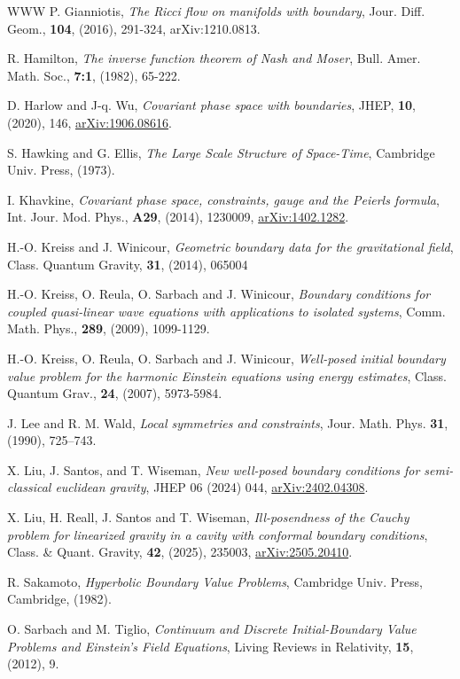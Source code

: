 \documentclass[10pt]{amsart}
\newcommand{\<}{\langle}
\renewcommand{\>}{\rangle}
\theoremstyle{plain}
\theoremstyle{remark}
\theoremstyle{definition}
\numberwithin{equation}{section}
\begin{document}
\begin{thebibliography}{WWW}
 P. Gianniotis, {\it The Ricci flow on manifolds with boundary}, Jour. Diff. Geom., {\bf 104}, (2016), 291-324, 
arXiv:1210.0813. 
 
  R. Hamilton, {\it The inverse function theorem of Nash and Moser}, Bull. Amer. Math. Soc., {\bf 7:1}, (1982), 65-222. 
 
 D. Harlow and J-q. Wu, {\it Covariant phase space with boundaries}, JHEP, {\bf 10}, (2020), 146, 
\href{https://arXiv.org/abs/1906.08616}{arXiv:1906.08616}. 

 S. Hawking and G. Ellis, {\it The Large Scale Structure of Space-Time}, Cambridge Univ. Press, (1973). 

 I. Khavkine, {\it Covariant phase space, constraints, gauge and the Peierls formula}, 
Int. Jour. Mod. Phys., {\bf A29}, (2014), 1230009, \href{https://arXiv.org/abs/1402.1282}{arXiv:1402.1282}. 

 H.-O. Kreiss and J. Winicour, {\it Geometric boundary data for the gravitational field}, Class. Quantum Gravity, 
{\bf 31}, (2014), 065004

 H.-O. Kreiss, O. Reula, O. Sarbach and J. Winicour, {\it Boundary conditions for coupled quasi-linear wave 
equations with applications to isolated systems}, Comm. Math. Phys., {\bf 289}, (2009), 1099-1129.  

 H.-O. Kreiss, O. Reula, O. Sarbach and J. Winicour, {\it Well-posed initial boundary value problem for the 
harmonic Einstein equations using energy estimates}, Class. Quantum Grav., {\bf 24}, (2007), 5973-5984.

 J. Lee and R. M. Wald, {\it Local symmetries and constraints}, Jour. Math. Phys. {\bf 31}, (1990), 725–743. 

 X. Liu, J. Santos, and T. Wiseman, {\it New well-posed boundary conditions for semi-classical
euclidean gravity}, JHEP 06 (2024) 044, \href{https://arXiv.org/abs/2402.04308}{arXiv:2402.04308}. 

 X. Liu, H. Reall, J. Santos and T. Wiseman, {\it Ill-posendness of the Cauchy problem for linearized gravity in a cavity with 
conformal boundary conditions}, Class. \& Quant. Gravity, {\bf 42}, (2025), 235003, \href{https://arXiv.org/abs/2505.20410}{arXiv:2505.20410}.

 R. Sakamoto, {\it Hyperbolic Boundary Value Problems}, Cambridge Univ. Press, Cambridge, (1982). 

 O. Sarbach and M. Tiglio, {\it Continuum and Discrete Initial-Boundary Value Problems and Einstein's Field 
Equations}, Living Reviews in Relativity, {\bf 15}, (2012), 9. 


\end{thebibliography}
\end{document}
